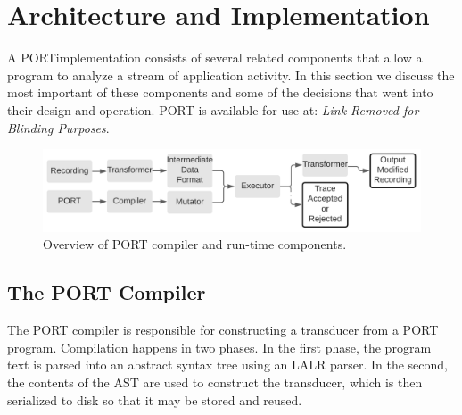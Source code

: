 \section{Architecture and Implementation}

A  PORTimplementation consists of several related
components that allow a program to analyze a stream of
application activity.
In this section we discuss the most important of these components and some
of the decisions that went into their design and operation.
PORT is available for use at: \textit{Link Removed for Blinding Purposes}.
\label{SEC:architecture}

\begin{figure}
\centering
  \includegraphics[scale=.19]{chapter5/images/architecture}
  \caption{Overview of PORT compiler and run-time components.}
  \label{fig:architecture}
\end{figure}

\subsection{The PORT Compiler}

The PORT compiler is responsible for constructing a transducer
from a PORT program.
Compilation happens in two phases.  In the first phase, the program text is
parsed into an abstract syntax tree using an LALR parser.
In the second, the
contents of the AST are used to construct the transducer, which is then serialized to
disk so that it may be stored and reused.

